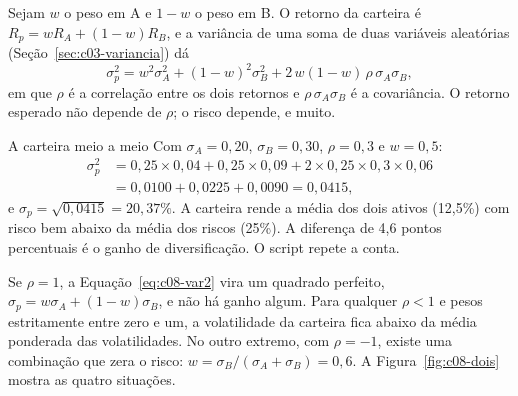 Sejam $w$ o peso em A e $1-w$ o peso em B. O retorno da carteira é $R_p = wR_A + (1-w)R_B$, e a variância de uma soma de duas variáveis aleatórias (Seção~\ref{sec:c03-variancia}) dá
\begin{equation}
  \sigma_p^2 = w^2\sigma_A^2 + (1-w)^2\sigma_B^2 + 2\,w(1-w)\,\rho\,\sigma_A\sigma_B ,
  \label{eq:c08-var2}
\end{equation}
em que $\rho$ é a correlação entre os dois retornos e $\rho\,\sigma_A\sigma_B$ é a covariância. O retorno esperado não depende de $\rho$; o risco depende, e muito.

\begin{exemplo}{A carteira meio a meio}
Com $\sigma_A = 0,20$, $\sigma_B = 0,30$, $\rho = 0,3$ e $w = 0,5$:
\begin{align*}
  \sigma_p^2 &= 0,25 \times 0,04 + 0,25 \times 0,09 + 2 \times 0,25 \times 0,3 \times 0,06 \\
             &= 0,0100 + 0,0225 + 0,0090 = 0,0415 ,
\end{align*}
e $\sigma_p = \sqrt{0,0415} = 20,37\%$. A carteira rende a média dos dois ativos (12,5\%) com risco bem abaixo da média dos riscos (25\%). A diferença de 4,6 pontos percentuais é o ganho de diversificação. O script  repete a conta.
\end{exemplo}

Se $\rho = 1$, a Equação~\eqref{eq:c08-var2} vira um quadrado perfeito, $\sigma_p = w\sigma_A + (1-w)\sigma_B$, e não há ganho algum. Para qualquer $\rho < 1$ e pesos estritamente entre zero e um, a volatilidade da carteira fica abaixo da média ponderada das volatilidades. No outro extremo, com $\rho = -1$, existe uma combinação que zera o risco: $w = \sigma_B/(\sigma_A + \sigma_B) = 0,6$. A Figura~\ref{fig:c08-dois} mostra as quatro situações.


